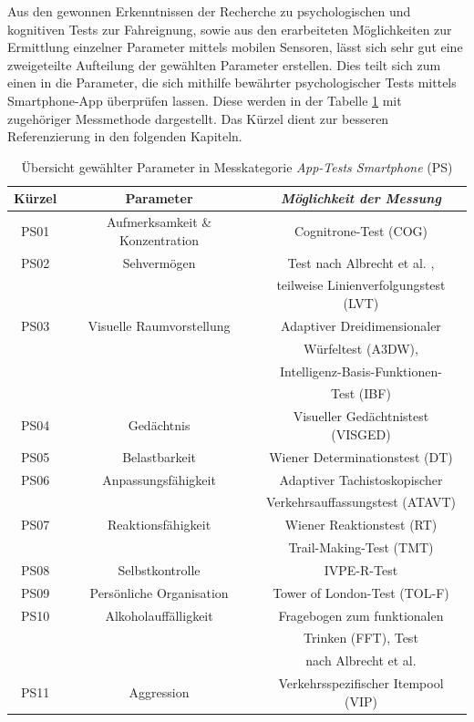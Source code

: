 Aus den gewonnen Erkenntnissen der Recherche zu psychologischen und kognitiven Tests zur Fahreignung, sowie aus den erarbeiteten Möglichkeiten zur Ermittlung einzelner Parameter mittels mobilen Sensoren, lässt sich sehr gut eine zweigeteilte Aufteilung der gewählten Parameter erstellen. Dies teilt sich zum einen in die Parameter, die sich mithilfe bewährter psychologischer Tests mittels Smartphone-App überprüfen lassen. Diese werden in der Tabelle \ref{tab:ps} mit zugehöriger Messmethode dargestellt. Das Kürzel dient zur besseren Referenzierung in den folgenden Kapiteln. 

\begin{table}[htbp]
	\caption{Übersicht gewählter Parameter in Messkategorie \textit{App-Tests Smartphone} (PS)}
	\begin{center}
		\begin{tabular}{c c c }
			\hline
			Kürzel& \textbf{Parameter} & \textbf{\textit{Möglichkeit der Messung}}\\
			\hline
			PS01 & Aufmerksamkeit \& Konzentration& Cognitrone-Test (COG)  \\
			PS02 & Sehvermögen& Test nach Albrecht et al. \cite{mobilesmarttracking}, \\
			&& teilweise Linienverfolgungstest (LVT) \\
			PS03 &Visuelle Raumvorstellung&Adaptiver Dreidimensionaler \\
			&&Würfeltest (A3DW), \\ 
			&&Intelligenz-Basis-Funktionen-\\
			&&Test (IBF) \\
			PS04 & Gedächtnis& Visueller Gedächtnistest (VISGED)\\
			PS05 & Belastbarkeit & Wiener Determinationstest (DT) \\
			PS06 & Anpassungsfähigkeit & Adaptiver Tachistoskopischer \\
			&&Verkehrsauffassungstest (ATAVT) \\
			PS07&Reaktionsfähigkeit&Wiener Reaktionstest (RT) \\
			&& Trail-Making-Test (TMT) \\
			PS08&Selbstkontrolle&IVPE-R-Test \\
			PS09&Persönliche Organisation&Tower of London-Test (TOL-F) \\
			PS10&Alkoholauffälligkeit&Fragebogen zum funktionalen \\
			&&Trinken (FFT), Test \\
			&&nach Albrecht et al. \cite{mobilesmarttracking} \\
			PS11&Aggression&Verkehrsspezifischer Itempool (VIP) \\
			\hline
		\end{tabular}
		\label{tab:ps}
	\end{center}
\end{table}

